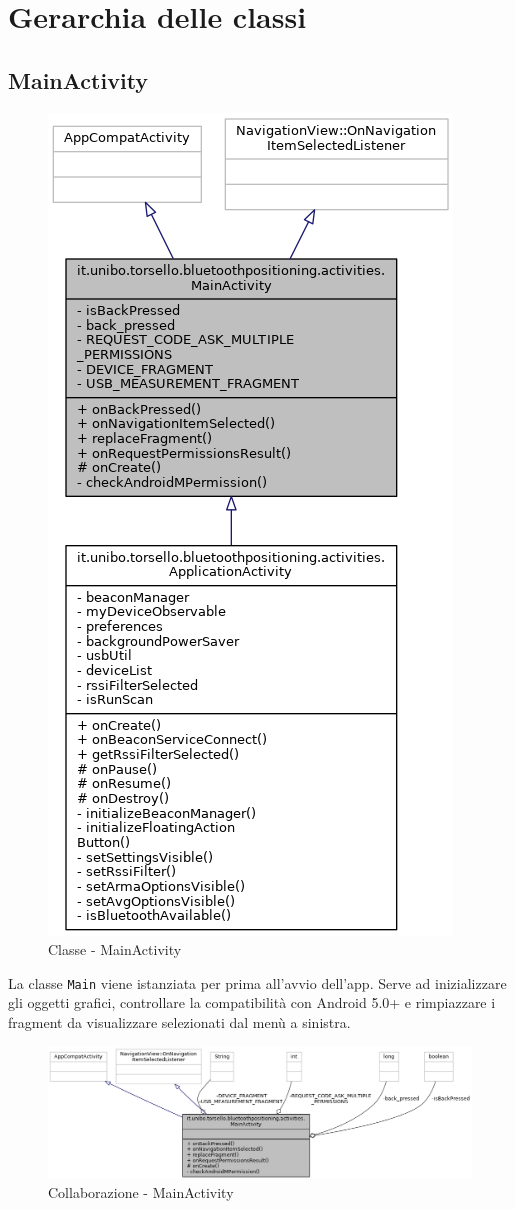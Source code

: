\chapter{Gerarchia delle classi}

\section{MainActivity}
\begin{figure}[ph]
	\centering
	\includegraphics[width=0.40\linewidth]{img/uml/class/classit_1_1unibo_1_1torsello_1_1bluetoothpositioning_1_1activities_1_1MainActivity__inherit__graph.png}
	\caption{Classe - MainActivity}
\end{figure}
La classe \texttt{Main} viene istanziata per prima all'avvio dell'app. Serve ad inizializzare gli oggetti grafici, controllare la compatibilità con Android 5.0+ e rimpiazzare i fragment da visualizzare selezionati dal menù a sinistra.

\begin{figure}[ph]
	\centering
	\includegraphics[width=1.6\linewidth,angle=90]{img/uml/class/classit_1_1unibo_1_1torsello_1_1bluetoothpositioning_1_1activities_1_1MainActivity__coll__graph.png}
	\caption{Collaborazione - MainActivity}
\end{figure}

